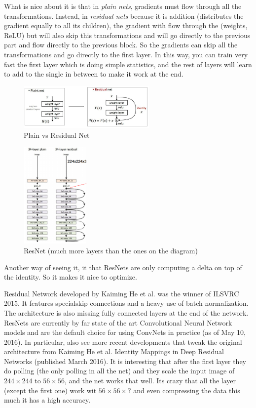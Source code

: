 What is nice about it is that in \textit{plain nets}, gradients must flow through all the transformations. Instead, in \textit{residual nets} because it is addition (distributes the gradient equally to all its children), the gradient with flow through the (weights, ReLU) but will also skip this transformations and will go directly to the previous part and flow directly to the previous block. So the gradients can skip all the transformations and go directly to the first layer. In this way, you can train very fast the first layer which is doing simple statistics, and the rest of layers will learn to add to the single in between to make it work at the end.

\begin{figure}[h]
  \centering
  \includegraphics[width=0.6\textwidth]{Images/famous_networks/6.png}
  \caption{Plain vs Residual Net}
\end{figure}

\begin{figure}[h]
  \centering
  \includegraphics[width=0.3\textwidth]{Images/famous_networks/7.png}
  \caption{ResNet (much more layers than the ones on the diagram)}
\end{figure}

Another way of seeing it, it that ResNets are only computing a delta on top of the identity. So it makes it nice to optimize.

 Residual Network developed by Kaiming He et al. was the winner of ILSVRC 2015. It features specialskip connections and a heavy use of batch normalization. The architecture is also missing fully connected layers at the end of the network. ResNets are currently by far state of the art Convolutional Neural Network models and are the default choice for using ConvNets in practice (as of May 10, 2016). In particular, also see more recent developments that tweak the original architecture from Kaiming He et al. Identity Mappings in Deep Residual Networks (published March 2016).
It is interesting that after the first layer they do polling (the only polling in all the net) and they scale the input image of $244 \times 244$ to $56 \times 56$, and the net works that well. Its crazy that all the layer (except the first one) work wit $56 \times 56 \times ?$ and even compressing the data this much it has a high accuracy.


